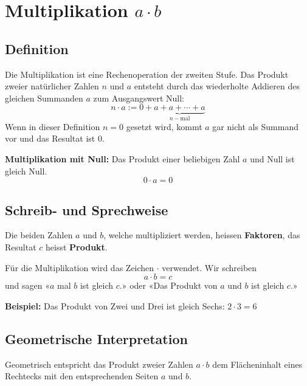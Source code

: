 \newpage
\section{Multiplikation $a\cdot b$}

\subsection{Definition}
Die Multiplikation ist eine Rechenoperation der zweiten Stufe. Das Produkt zweier natürlicher Zahlen $n$ und $a$ entsteht durch das wiederholte Addieren des gleichen Summanden $a$ zum Ausgangswert Null:
\[
  n\cdot a := 0+\underbrace{a+a+\cdots+a}_{n-\text{mal}}
\]
Wenn in dieser Definition $n=0$ gesetzt wird, kommt $a$ gar nicht als Summand vor und das Resultat ist $0$.
\begin{theorem}
  \textbf{Multiplikation mit Null:} Das Produkt einer beliebigen Zahl $a$ und Null ist gleich Null.
  \[
    0 \cdot a = 0
  \]
\end{theorem}

\subsection{Schreib- und Sprechweise}
Die beiden Zahlen $a$ und $b$, welche multipliziert werden, heissen \textbf{Faktoren}, das Resultat $c$ heisst \textbf{Produkt}.

Für die Multiplikation wird das Zeichen $\cdot$ verwendet. Wir schreiben
\[
  a \cdot b = c
\]
und sagen «$a$ mal $b$ ist gleich $c$.» oder «Das Produkt von $a$ und $b$ ist gleich $c$.»
\begin{example}
\textbf{Beispiel:} Das Produkt von Zwei und Drei ist gleich Sechs: $2 \cdot 3 = 6$
\end{example}

\subsection{Geometrische Interpretation}

Geometrisch entspricht das Produkt zweier Zahlen $a\cdot b$ dem Flächeninhalt eines Rechtecks mit den entsprechenden Seiten $a$ und $b$.

